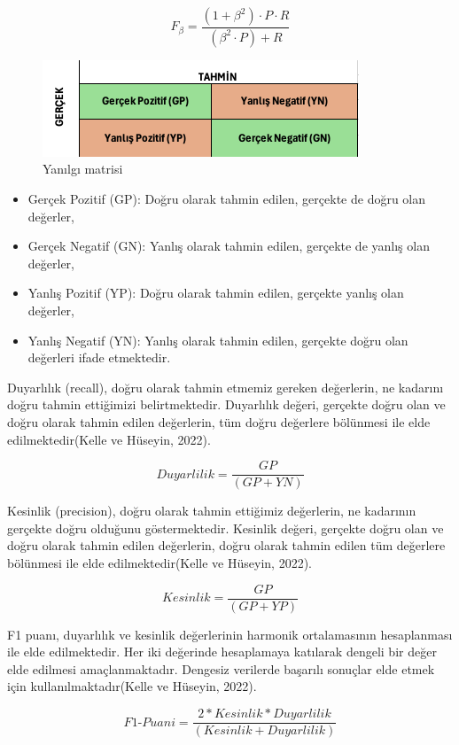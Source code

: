 \documentclass[12pt,twoside]{deuthesis}
\providecommand{\tightlist}{%
  \setlength{\itemsep}{0pt}\setlength{\parskip}{0pt}}
\begin{document}
\[F_{\beta} = \frac{(1 + \beta^2) \cdot P \cdot R}{(\beta^2 \cdot P) + R}\]

\begin{figure}
\includegraphics[width=357px,height=109px]{figure/conmat} \caption{Yanılgı matrisi}\label{fig:unnamed-chunk-2}
\end{figure}

\begin{itemize}
\tightlist
\item
  Gerçek Pozitif (GP): Doğru olarak tahmin edilen, gerçekte de doğru olan değerler,
\item
  Gerçek Negatif (GN): Yanlış olarak tahmin edilen, gerçekte de yanlış olan değerler,
\item
  Yanlış Pozitif (YP): Doğru olarak tahmin edilen, gerçekte yanlış olan değerler,
\item
  Yanlış Negatif (YN): Yanlış olarak tahmin edilen, gerçekte doğru olan değerleri ifade etmektedir.
\end{itemize}

Duyarlılık (recall), doğru olarak tahmin etmemiz gereken değerlerin, ne kadarını doğru tahmin ettiğimizi belirtmektedir. Duyarlılık değeri, gerçekte doğru olan ve doğru olarak tahmin edilen değerlerin, tüm doğru değerlere bölünmesi ile elde edilmektedir(Kelle ve Hüseyin, 2022).

\[Duyarlilik =  \frac{GP}{(GP + YN)}\]

Kesinlik (precision), doğru olarak tahmin ettiğimiz değerlerin, ne kadarının gerçekte doğru olduğunu göstermektedir. Kesinlik değeri, gerçekte doğru olan ve doğru olarak tahmin edilen değerlerin, doğru olarak tahmin edilen tüm değerlere bölünmesi ile elde edilmektedir(Kelle ve Hüseyin, 2022).

\[Kesinlik =  \frac{GP}{(GP + YP)}\]

F1 puanı, duyarlılık ve kesinlik değerlerinin harmonik ortalamasının hesaplanması ile elde edilmektedir. Her iki değerinde hesaplamaya katılarak dengeli bir değer elde edilmesi amaçlanmaktadır. Dengesiz verilerde başarılı sonuçlar elde etmek için kullanılmaktadır(Kelle ve Hüseyin, 2022).

\[ F1\text{-}Puani = \frac{2 * Kesinlik * Duyarlilik}{(Kesinlik + Duyarlilik)} \]
\end{document}
